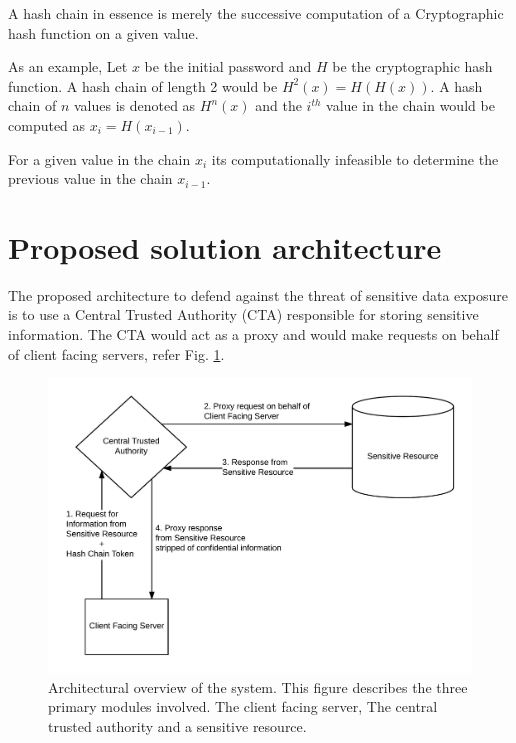 \documentclass{sig-alternate-05-2015}
\begin{document}

A hash chain in essence is merely the successive computation of a Cryptographic hash function on a given value. 

As an example, Let $x$ be the initial password and $H$ be the cryptographic hash function.  A hash chain of length 2 would be $H^{2}(x) = H(H(x))$. A hash chain of $n$ values is denoted as $H^{n}(x)$ and the $i^{th}$ value in the chain would be computed as $x_{i} = H(x_{i-1})$.

For a given value in the chain $x_{i}$ its computationally infeasible to determine the previous value in the chain $x_{i-1}$.


\section*{Proposed solution architecture}

The proposed architecture to defend against the threat of sensitive data exposure is to use a Central Trusted Authority (CTA) responsible for storing sensitive information. The CTA would act as a proxy and would make requests on behalf of client facing servers, refer Fig. \ref{fig:architectureoverview}.

\begin{figure}[ht]
\includegraphics[keepaspectratio=true,scale=0.145]{overview_architecture.png}
\caption{Architectural overview of the system. This figure describes the three primary modules involved. The client facing server, The central trusted authority and a sensitive resource.}
\label{fig:architectureoverview} 
\end{figure}
\end{document}
